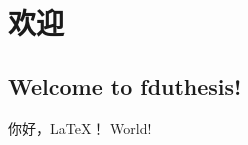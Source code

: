 \documentclass{fduthesis}
\begin{document}
\chapter{欢迎}
\section{Welcome to fduthesis!}
你好，\LaTeX{}！
World!
\end{document}
